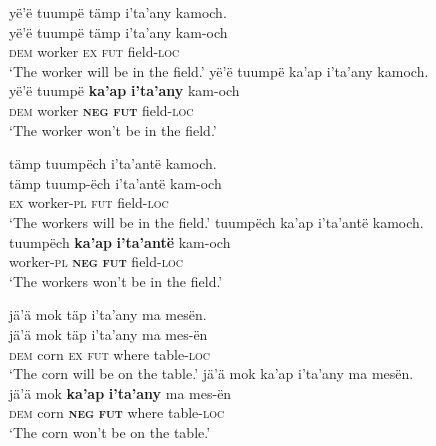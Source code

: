 \documentclass[output=paper,colorlinks,citecolor=brown,draft]{langscibook}
\begin{document}
\ea\label{ex:mix:67}
    \ea\label{ex:mix:67a}
        \glll yë’ë tuumpë tämp i'ta’any kamoch.\\ 
              yë’ë tuumpë tämp i'ta’any kam-och\\
              \textsc{dem} worker \textsc{ex} \textsc{fut} field-\textsc{loc}\\
        \glt ‘The worker will be in the field.’
    \ex\label{ex:mix:67b}
        \glll  yë’ë tuumpë ka’ap i'ta’any kamoch.\\
             yë’ë tuumpë \textbf{ka’ap} \textbf{i'ta’any} kam-och\\
             \textsc{dem} worker \textbf{\textsc{neg}} \textsc{\textbf{fut}} field-\textsc{loc}\\
        \glt ‘The worker won’t be in the field.’
    \z
\z 
 
\ea\label{ex:mix:68}
    \ea\label{ex:mix:68a}
        \glll tämp tuumpëch i’ta’antë kamoch.\\ 
              tämp tuump-ëch i’ta’antë kam-och\\
              \textsc{ex} worker-\textsc{pl} \textsc{fut} field-\textsc{loc}\\
        \glt ‘The workers will be in the field.’
    \ex\label{ex:mix:68b}
        \glll  tuumpëch ka’ap i'ta’antë kamoch.\\
             tuumpëch \textbf{ka’ap} \textbf{i'ta’antë} kam-och\\
             worker-\textsc{pl} \textbf{\textsc{neg}} \textsc{\textbf{fut}} field-\textsc{loc} \\
        \glt ‘The workers won’t be in the field.’
    \z
\z 
 
\ea\label{ex:mix:69}
    \ea\label{ex:mix:69a}
        \glll jä’ä mok täp i'ta’any ma mesën.\\ 
              jä’ä mok täp i'ta’any ma mes-ën\\
              \textsc{dem} corn \textsc{ex} \textsc{fut} where table-\textsc{loc}\\
        \glt ‘The corn will be on the table.’
    \ex\label{ex:mix:69b}
        \glll jä’ä mok ka’ap i'ta’any ma mesën. \\
             jä’ä mok \textbf{ka’ap} \textbf{i'ta’any} ma mes-ën\\
             \textsc{dem} corn \textbf{\textsc{neg}} \textsc{\textbf{fut}} where table-\textsc{loc}\\
        \glt ‘The corn won’t be on the table.’
    \z
\z 
 
\end{document}
